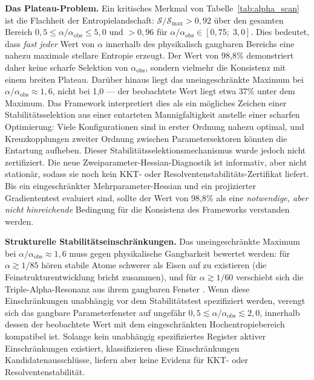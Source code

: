 \documentclass[12pt,a4paper]{article}
\theoremstyle{remark}
\begin{document}
\textbf{Das Plateau-Problem.} Ein kritisches Merkmal von Tabelle~\ref{tab:alpha_scan} ist die Flachheit der Entropielandschaft: $\mathcal{S}/\mathcal{S}_{\max} > 0{,}92$ \"uber den gesamten Bereich $0{,}5 \leq \alpha/\alpha_{\text{obs}} \leq 5{,}0$ und $> 0{,}96$ f\"ur $\alpha/\alpha_{\text{obs}} \in [0{,}75;\; 3{,}0]$. Dies bedeutet, dass \emph{fast jeder} Wert von $\alpha$ innerhalb des physikalisch gangbaren Bereichs eine nahezu maximale stellare Entropie erzeugt. Der Wert von 98,8\% demonstriert daher keine scharfe Selektion von $\alpha_{\text{obs}}$, sondern vielmehr die Konsistenz mit einem breiten Plateau. Dar\"uber hinaus liegt das uneingeschr\"ankte Maximum bei $\alpha/\alpha_{\text{obs}} \approx 1{,}6$, nicht bei 1,0 --- der beobachtete Wert liegt etwa 37\% unter dem Maximum. Das Framework interpretiert dies als ein m\"ogliches Zeichen einer Stabilit\"atsselektion aus einer entarteten Mannigfaltigkeit anstelle einer scharfen Optimierung: Viele Konfigurationen sind in erster Ordnung nahezu optimal, und Kreuzkopplungen zweiter Ordnung zwischen Parametersektoren k\"onnten die Entartung aufheben. Dieser Stabilit\"atsselektionsmechanismus wurde jedoch nicht zertifiziert. Die neue Zweiparameter-Hessian-Diagnostik ist informativ, aber nicht station\"ar, sodass sie noch kein KKT- oder Resolventenstabilit\"ats-Zertifikat liefert. Bis ein eingeschr\"ankter Mehrparameter-Hessian und ein projizierter Gradiententest evaluiert sind, sollte der Wert von 98,8\% als eine \emph{notwendige, aber nicht hinreichende} Bedingung f\"ur die Konsistenz des Frameworks verstanden werden.

\textbf{Strukturelle Stabilit\"atseinschr\"ankungen.} Das uneingeschr\"ankte Maximum bei $\alpha / \alpha_{\text{obs}} \approx 1{,}6$ muss gegen physikalische Gangbarkeit bewertet werden: f\"ur $\alpha \gtrsim 1/85$ h\"oren stabile Atome schwerer als Eisen auf zu existieren (die Feinstrukturentwicklung bricht zusammen), und f\"ur $\alpha \gtrsim 1/60$ verschiebt sich die Triple-Alpha-Resonanz aus ihrem gangbaren Fenster \citep{Adams2019}. Wenn diese Einschr\"ankungen unabh\"angig vor dem Stabilit\"atstest spezifiziert werden, verengt sich das gangbare Parameterfenster auf ungef\"ahr $0{,}5 \lesssim \alpha/\alpha_{\text{obs}} \lesssim 2{,}0$, innerhalb dessen der beobachtete Wert mit dem eingeschr\"ankten Hochentropiebereich kompatibel ist. Solange kein unabh\"angig spezifiziertes Register aktiver Einschr\"ankungen existiert, klassifizieren diese Einschr\"ankungen Kandidatenausschl\"usse, liefern aber keine Evidenz f\"ur KKT- oder Resolventenstabilit\"at.
\end{document}
